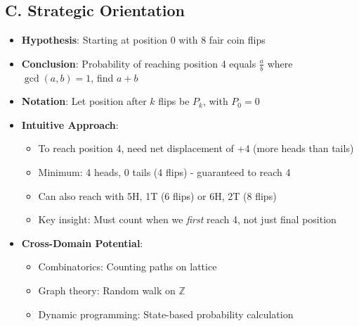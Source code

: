 \documentclass[]{article}
\begin{document}
\begin{problemconfigbox}
\subsection*{C. Strategic Orientation}
\begin{itemize}[leftmargin=*]
    \item \textbf{Hypothesis}: Starting at position 0 with 8 fair coin flips
    \item \textbf{Conclusion}: Probability of reaching position 4 equals $\frac{a}{b}$ where $\gcd(a,b)=1$, find $a+b$
    \item \textbf{Notation}: Let position after $k$ flips be $P_k$, with $P_0 = 0$
    \item \textbf{Intuitive Approach}: 
    \begin{itemize}
        \item To reach position 4, need net displacement of +4 (more heads than tails)
        \item Minimum: 4 heads, 0 tails (4 flips) - guaranteed to reach 4
        \item Can also reach with 5H, 1T (6 flips) or 6H, 2T (8 flips)
        \item Key insight: Must count when we \textit{first} reach 4, not just final position
    \end{itemize}
    \item \textbf{Cross-Domain Potential}: 
    \begin{itemize}
        \item Combinatorics: Counting paths on lattice
        \item Graph theory: Random walk on $\mathbb{Z}$
        \item Dynamic programming: State-based probability calculation
    \end{itemize}
\end{itemize}
\end{problemconfigbox}
\end{document}
